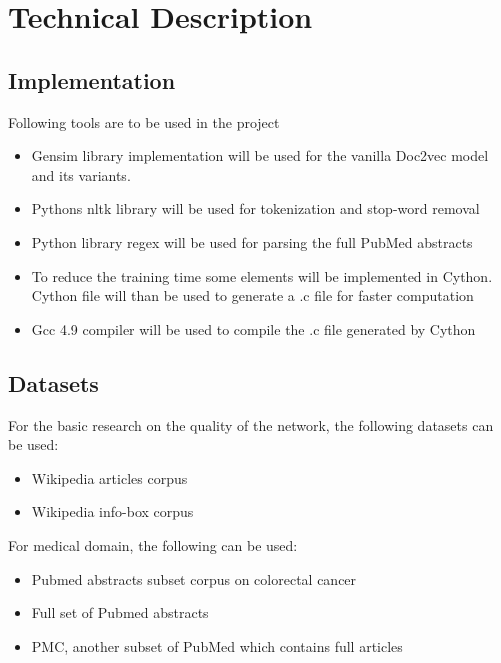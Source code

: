 \documentclass[12pt,a4paper] {article}
\begin{document}
\section*{Technical Description} 
\subsection*{Implementation}
Following tools are to be used in the project

\begin{itemize}
	\item Gensim library \cite{rehurek_lrec} implementation will be used for the vanilla Doc2vec model and its variants. 
	
	\item Pythons nltk library will be used for tokenization and stop-word removal
	
	\item Python library regex will be used for parsing the full PubMed abstracts 
	
	\item To reduce the training time some elements will be implemented in Cython. Cython file will than be used to generate a .c file for faster computation
	
	\item Gcc 4.9 compiler will be used to compile the .c file generated by Cython 
	
	
\end{itemize}


\subsection*{Datasets}
For the basic research on the quality of the network, the following datasets can 
be used:
\begin{itemize}
	\item Wikipedia articles corpus
	\item Wikipedia info-box corpus
\end{itemize}

For medical domain, the following can be used:
\begin{itemize}
	\item Pubmed abstracts subset corpus on colorectal cancer
	\item Full set of Pubmed abstracts
	\item PMC, another subset of PubMed which contains full articles
\end{itemize}
\end{document}
